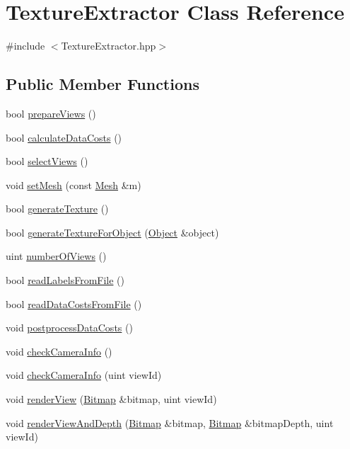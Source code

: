 \hypertarget{class_texture_extractor}{}\section{Texture\+Extractor Class Reference}
\label{class_texture_extractor}


{\ttfamily \#include $<$Texture\+Extractor.\+hpp$>$}

\subsection*{Public Member Functions}
\begin{DoxyCompactItemize}
\item 
bool \hyperlink{class_texture_extractor_a5d1efa1c5208f8a1e67142dd38fbf5a2}{prepare\+Views} ()
\item 
bool \hyperlink{class_texture_extractor_af7e364344bda2e0c6784c82b50a6f979}{calculate\+Data\+Costs} ()
\item 
bool \hyperlink{class_texture_extractor_abeb85c1ced22591fda614af1f351e817}{select\+Views} ()
\item 
void \hyperlink{class_texture_extractor_ae02d3f7a8ebf636fd7fc17ab13570f59}{set\+Mesh} (const \hyperlink{class_mesh}{Mesh} \&m)
\item 
bool \hyperlink{class_texture_extractor_a58176e3b3dc4f2edaaa900a7e922ab05}{generate\+Texture} ()
\item 
bool \hyperlink{class_texture_extractor_aeda3235d55d4dec0d1f40d42bc97a2c4}{generate\+Texture\+For\+Object} (\hyperlink{struct_object}{Object} \&object)
\item 
uint \hyperlink{class_texture_extractor_a57b2eef07397ceeedf461343aff6afbc}{number\+Of\+Views} ()
\item 
bool \hyperlink{class_texture_extractor_ad3855ac7764dc5af24e776e928bed802}{read\+Labels\+From\+File} ()
\item 
bool \hyperlink{class_texture_extractor_a9f3605a51c466cca05f8ff216c84d574}{read\+Data\+Costs\+From\+File} ()
\item 
void \hyperlink{class_texture_extractor_a196dde057ce49bcae8cc7d07cf00f8cc}{postprocess\+Data\+Costs} ()
\item 
void \hyperlink{class_texture_extractor_a82baa1e8ae7c17bd9f1d44b431f82f86}{check\+Camera\+Info} ()
\item 
void \hyperlink{class_texture_extractor_a93b91c57ec384eaf45a36c917b6c9e63}{check\+Camera\+Info} (uint view\+Id)
\item 
void \hyperlink{class_texture_extractor_a77c9ce096ece162dac08599fc7c0ee47}{render\+View} (\hyperlink{class_bitmap}{Bitmap} \&bitmap, uint view\+Id)
\item 
void \hyperlink{class_texture_extractor_ab805f165c443e6f1616ee0be9afa74e3}{render\+View\+And\+Depth} (\hyperlink{class_bitmap}{Bitmap} \&bitmap, \hyperlink{class_bitmap}{Bitmap} \&bitmap\+Depth, uint view\+Id)
\end{DoxyCompactItemize}


